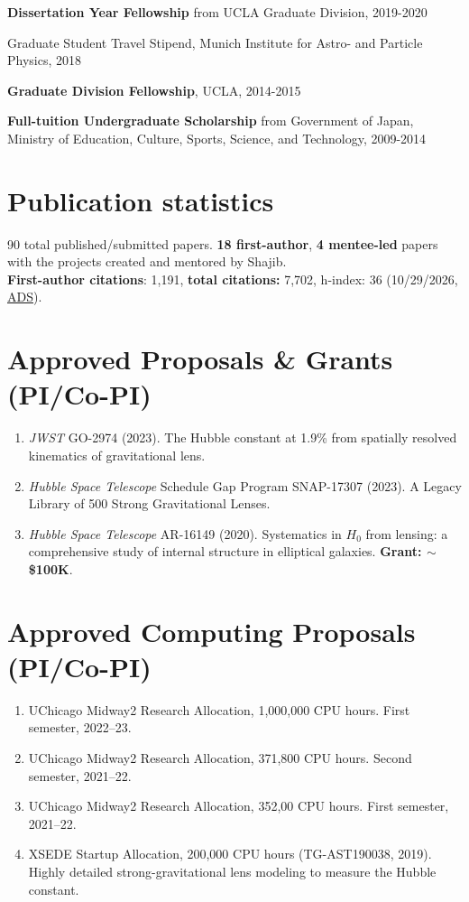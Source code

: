 \documentclass[margin, line]{res}
\newcommand{\pubstat}{
\section{\sc Publication statistics} 90 total published/submitted papers. \textbf{18 first-author}, \textbf{4 mentee-led} papers with the projects created and mentored by {Shajib}. \\ \textbf{First-author citations}: 1,191, \textbf{total citations:} 7,702, h-index: 36 (10/29/2026, \href{https://ui.adsabs.harvard.edu/user/libraries/NYgiA71JS4CR85Tt8CgJsw}{ADS}).
}
\begin{document}
\begin{resume}
\vspace*{-2.5mm}
\textbf{Dissertation Year Fellowship} from UCLA Graduate Division, 2019-2020%

\vspace*{-2.5mm}
Graduate Student Travel Stipend, {Munich Institute for Astro- and Particle Physics}, 2018%


\vspace*{-2.5mm}
\textbf{Graduate Division Fellowship}, UCLA, 2014-2015%

\vspace*{-2.5mm}
\textbf{Full-tuition Undergraduate Scholarship} from {Government of Japan, Ministry of Education, Culture, Sports, Science, and Technology}, 2009-2014%

\pubstat
\vspace*{2.5mm}

\section{\sc Approved Proposals \& Grants (PI/Co-PI)}
\begin{enumerate}
	\item \textit{JWST} GO-2974 (2023). The Hubble constant at 1.9\% from spatially resolved kinematics of gravitational lens.
	\item \textit{Hubble Space Telescope} Schedule Gap Program SNAP-17307 (2023). A Legacy Library of 500 Strong Gravitational Lenses.
	\item \textit{Hubble Space Telescope} AR-16149 (2020). Systematics in $H_0$ from lensing: a comprehensive study of internal structure in elliptical galaxies. \textbf{Grant: $\sim$\$100K}.
\end{enumerate}

\section{\sc Approved Computing Proposals (PI/Co-PI)}
\begin{enumerate}
\item UChicago Midway2 Research Allocation, 1,000,000 CPU hours. First semester, 2022--23.
\item UChicago Midway2 Research Allocation, 371,800 CPU hours. Second semester, 2021--22.
\item UChicago Midway2 Research Allocation, 352,00 CPU hours. First semester, 2021--22.
\item XSEDE Startup Allocation, 200,000 CPU hours (TG-AST190038, 2019). Highly detailed strong-gravitational lens modeling to measure the Hubble constant.   
\end{enumerate}


\end{resume}
\end{document}
